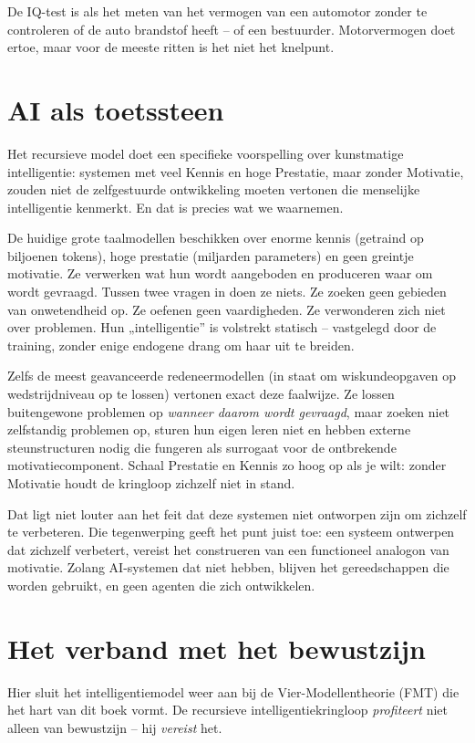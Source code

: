 \documentclass[11pt, twoside, openright]{book}
\begin{document}
De IQ-test is als het meten van het vermogen van een automotor zonder te controleren of de auto brandstof heeft -- of een bestuurder. Motorvermogen doet ertoe, maar voor de meeste ritten is het niet het knelpunt.

\section*{AI als toetssteen}

Het recursieve model doet een specifieke voorspelling over kunstmatige intelligentie: systemen met veel Kennis en hoge Prestatie, maar zonder Motivatie, zouden niet de zelfgestuurde ontwikkeling moeten vertonen die menselijke intelligentie kenmerkt. En dat is precies wat we waarnemen.

De huidige grote taalmodellen beschikken over enorme kennis (getraind op biljoenen tokens), hoge prestatie (miljarden parameters) en geen greintje motivatie. Ze verwerken wat hun wordt aangeboden en produceren waar om wordt gevraagd. Tussen twee vragen in doen ze niets. Ze zoeken geen gebieden van onwetendheid op. Ze oefenen geen vaardigheden. Ze verwonderen zich niet over problemen. Hun „intelligentie” is volstrekt statisch -- vastgelegd door de training, zonder enige endogene drang om haar uit te breiden.

Zelfs de meest geavanceerde redeneermodellen (in staat om wiskundeopgaven op wedstrijdniveau op te lossen) vertonen exact deze faalwijze. Ze lossen buitengewone problemen op \textit{wanneer daarom wordt gevraagd}, maar zoeken niet zelfstandig problemen op, sturen hun eigen leren niet en hebben externe steunstructuren nodig die fungeren als surrogaat voor de ontbrekende motivatiecomponent. Schaal Prestatie en Kennis zo hoog op als je wilt: zonder Motivatie houdt de kringloop zichzelf niet in stand.

Dat ligt niet louter aan het feit dat deze systemen niet ontworpen zijn om zichzelf te verbeteren. Die tegenwerping geeft het punt juist toe: een systeem ontwerpen dat zichzelf verbetert, vereist het construeren van een functioneel analogon van motivatie. Zolang AI-systemen dat niet hebben, blijven het gereedschappen die worden gebruikt, en geen agenten die zich ontwikkelen.

\section*{Het verband met het bewustzijn}

Hier sluit het intelligentiemodel weer aan bij de Vier-Modellentheorie (FMT) die het hart van dit boek vormt. De recursieve intelligentiekringloop \textit{profiteert} niet alleen van bewustzijn -- hij \textit{vereist} het.
\end{document}
